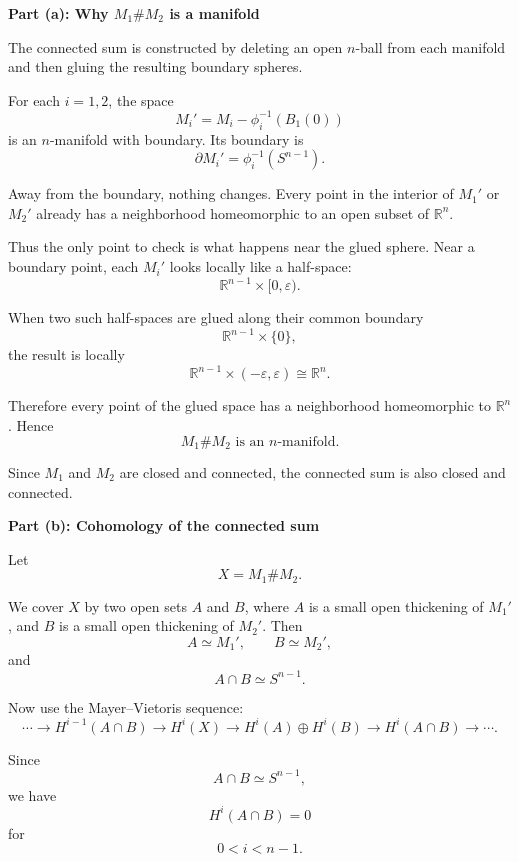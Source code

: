 \begin{solution}

\medskip
\noindent\textbf{}\par
\smallskip


\medskip
\noindent\textbf{Part (a): Why \texorpdfstring{$M_1\#M_2$}{M1\#M2} is a manifold}\par
\smallskip


The connected sum is constructed by deleting an open \(n\)-ball from each
manifold and then gluing the resulting boundary spheres.

For each \(i=1,2\), the space
\[
M_i'
=
M_i-\phi_i^{-1}(B_1(0))
\]
is an \(n\)-manifold with boundary. Its boundary is
\[
\partial M_i'
=
\phi_i^{-1}(S^{n-1}).
\]

Away from the boundary, nothing changes. Every point in the interior of
\(M_1'\) or \(M_2'\) already has a neighborhood homeomorphic to an open
subset of \(\mathbb{R}^n\).

Thus the only point to check is what happens near the glued sphere. Near a
boundary point, each \(M_i'\) looks locally like a half-space:
\[
\mathbb{R}^{n-1}\times [0,\varepsilon).
\]

When two such half-spaces are glued along their common boundary
\[
\mathbb{R}^{n-1}\times \{0\},
\]
the result is locally
\[
\mathbb{R}^{n-1}\times (-\varepsilon,\varepsilon)
\cong
\mathbb{R}^n.
\]

Therefore every point of the glued space has a neighborhood homeomorphic to
\(\mathbb{R}^n\). Hence
\[
\boxed{M_1\#M_2\text{ is an }n\text{-manifold}.}
\]

Since \(M_1\) and \(M_2\) are closed and connected, the connected sum is also
closed and connected.


\medskip
\noindent\textbf{Part (b): Cohomology of the connected sum}\par
\smallskip


Let
\[
X=M_1\#M_2.
\]

We cover \(X\) by two open sets \(A\) and \(B\), where \(A\) is a small open
thickening of \(M_1'\), and \(B\) is a small open thickening of \(M_2'\).
Then
\[
A\simeq M_1',
\qquad
B\simeq M_2',
\]
and
\[
A\cap B\simeq S^{n-1}.
\]

Now use the Mayer--Vietoris sequence:
\[
\cdots
\longrightarrow
H^{i-1}(A\cap B)
\longrightarrow
H^i(X)
\longrightarrow
H^i(A)\oplus H^i(B)
\longrightarrow
H^i(A\cap B)
\longrightarrow
\cdots .
\]

Since
\[
A\cap B\simeq S^{n-1},
\]
we have
\[
H^i(A\cap B)=0
\]
for
\[
0<i<n-1.
\]


\end{solution}
